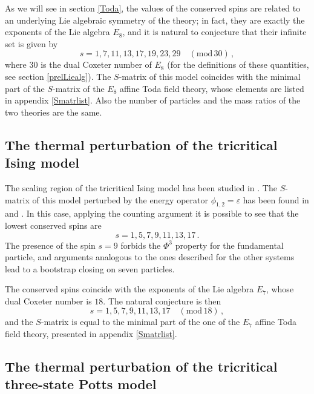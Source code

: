 \documentclass[a4paper,12pt]{report}
\begin{document}
As we will see in section \ref{Toda}, the values of the conserved spins are related to an underlying Lie
algebraic symmetry of the theory; in fact, they are exactly the exponents of the Lie algebra $E_{8}$, and it is
natural to conjecture that their infinite set is given by
\begin{equation}
s=1,7,11,13,17,19,23,29\quad(\textrm{mod}\, 30)\,,
\end{equation}
where $30$ is the dual Coxeter number of $E_{8}$ (for the definitions of these quantities, see section
\ref{prelLiealg}). The $S$-matrix of this model coincides with the minimal part of the $S$-matrix of the $E_{8}$
affine Toda field theory, whose elements are listed in appendix \ref{Smatrlist}. Also the number of particles and
the mass ratios of the two theories are the same.


\subsection{The thermal perturbation of the tricritical Ising model}

The scaling region of the tricritical Ising model has been studied in \cite{TIMscaling}. The $S$-matrix of this
model perturbed by the energy operator $\phi_{1,2}=\varepsilon$ has been found in \cite{fatzam} and
\cite{chrmuss1}. In this case, applying the counting argument it is possible to see that the lowest conserved
spins are
\begin{equation}
s=1,5,7,9,11,13,17\,.
\end{equation}
The presence of the spin $s=9$ forbids the $\Phi^{3}$ property for the fundamental particle, and arguments
analogous to the ones described for the other systems lead to a bootstrap closing on seven particles.

The conserved spins coincide with the exponents of the Lie algebra $E_{7}$, whose dual Coxeter number is $18$. The
natural conjecture is then
\begin{equation}
s=1,5,7,9,11,13,17 \quad (\textrm{mod}\, 18)\,,
\end{equation}
and the $S$-matrix is equal to the minimal part of the one of the $E_{7}$ affine Toda field theory, presented in
appendix \ref{Smatrlist}.


\subsection{The thermal perturbation of the tricritical three-state Potts model}
\end{document}
